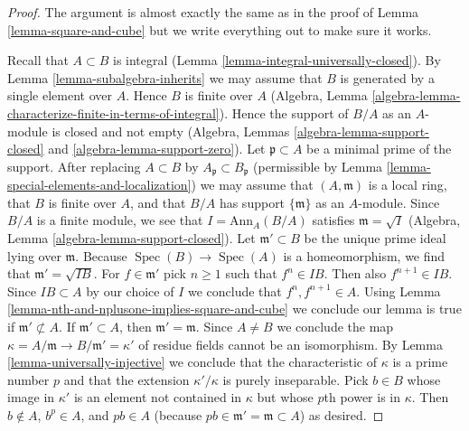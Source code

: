 \documentclass[10pt,a4paper]{amsart}
\theoremstyle{plain}
\theoremstyle{definition}
\theoremstyle{remark}
\numberwithin{equation}{subsection}
\def\Spec{\mathop{\mathrm{Spec}}}
\begin{document}
\begin{proof}
The argument is almost exactly the same as in the proof of
Lemma \ref{lemma-square-and-cube} but we write everything
out to make sure it works.

\medskip\noindent
Recall that $A \subset B$ is integral
(Lemma \ref{lemma-integral-universally-closed}).
By Lemma \ref{lemma-subalgebra-inherits}
we may assume that $B$ is generated by a single element
over $A$. Hence $B$ is finite over $A$
(Algebra, Lemma \ref{algebra-lemma-characterize-finite-in-terms-of-integral}).
Hence the support of $B/A$ as an $A$-module is
closed and not empty (Algebra, Lemmas
\ref{algebra-lemma-support-closed} and \ref{algebra-lemma-support-zero}).
Let $\mathfrak p \subset A$ be a minimal prime
of the support. After replacing $A \subset B$ by
$A_\mathfrak p \subset B_\mathfrak p$ (permissible by
Lemma \ref{lemma-special-elements-and-localization})
we may assume that $(A, \mathfrak m)$ is a local ring,
that $B$ is finite over $A$, and that $B/A$ has support $\{\mathfrak m\}$
as an $A$-module. Since $B/A$ is a finite module,
we see that $I = \text{Ann}_A(B/A)$ satisfies $\mathfrak m = \sqrt{I}$
(Algebra, Lemma \ref{algebra-lemma-support-closed}).
Let $\mathfrak m' \subset B$ be the unique prime ideal lying over
$\mathfrak m$. Because $\Spec(B) \to \Spec(A)$ is a homeomorphism,
we find that $\mathfrak m' = \sqrt{IB}$.
For $f \in \mathfrak m'$ pick $n \geq 1$ such that
$f^n \in IB$. Then also $f^{n + 1} \in IB$.
Since $IB \subset A$ by our choice of $I$ we conclude that
$f^n, f^{n + 1} \in A$. Using
Lemma \ref{lemma-nth-and-nplusone-implies-square-and-cube}
we conclude our lemma is true if $\mathfrak m' \not \subset A$.
If $\mathfrak m' \subset A$, then $\mathfrak m' = \mathfrak m$.
Since $A \not = B$ we conclude the map
$\kappa = A/\mathfrak m \to B/\mathfrak m' = \kappa'$
of residue fields cannot be an isomorphism. By
Lemma \ref{lemma-universally-injective} we conclude
that the characteristic of $\kappa$ is a prime number $p$
and that the extension $\kappa'/\kappa$ is purely inseparable.
Pick $b \in B$ whose image in $\kappa'$ is an element
not contained in $\kappa$ but whose $p$th power is in $\kappa$.
Then $b \not \in A$, $b^p \in A$, and $pb \in A$
(because $pb \in \mathfrak m' = \mathfrak m \subset A$)
as desired.
\end{proof}
\end{document}
